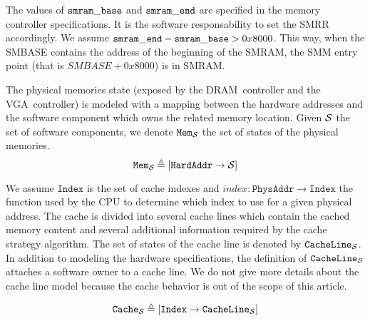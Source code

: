 The values of $\mathtt{smram\_base}$ and $\mathtt{smram\_end}$ are specified in the
memory controller specifications. It is the software responsability to set the
SMRR accordingly. We assume $\mathtt{smram\_end} - \mathtt{smram\_base} > 0x8000$.
This way, when the SMBASE contains the address of the beginning of the SMRAM,
the SMM entry point (that is $SMBASE + 0x8000$) is in SMRAM.

The physical memories state (exposed by the DRAM controller and the
VGA controller) is modeled with a mapping between the hardware addresses and the
software component which owns the related memory location. Given $\mathcal{S}$ the
set of software components, we denote $\texttt{Mem}_{\mathcal{S}}$ the set of states
of the physical memories. \[ \texttt{Mem}_{\mathcal{S}} \triangleq [
\texttt{HardAddr} \rightarrow \mathcal{S} ] \]

We assume $\texttt{Index}$ is the set of cache indexes and $index :
\texttt{PhysAddr} \rightarrow \texttt{Index}$ the function used by the CPU to
determine which index to use for a given physical address. The cache is divided
into several cache lines which contain the cached memory content and several
additional information required by the cache strategy algorithm. The set of
states of the cache line is denoted by $\texttt{CacheLine}_{\mathcal{S}}$. In
addition to modeling the hardware specifications, the definition of
$\texttt{CacheLine}_{\mathcal{S}}$ attaches a software owner to a cache line. We do
not give more details about the cache line model because the cache behavior is
out of the scope of this article.


\[ \texttt{Cache}_{\mathcal{S}} \triangleq [ \texttt{Index} \rightarrow
\texttt{CacheLine}_{\mathcal{S}} ] \]

